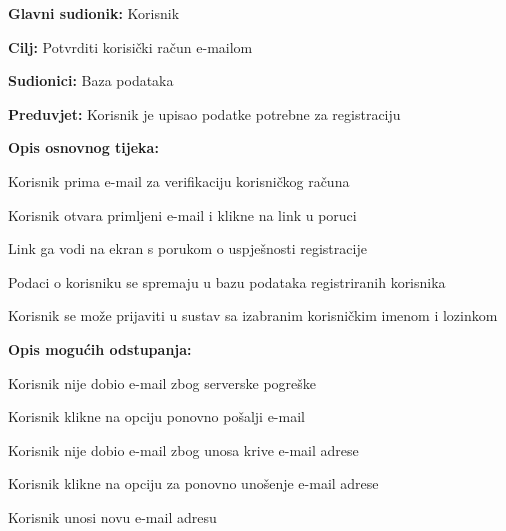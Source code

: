 					\noindent {}
					\begin{packed_item}
						
						\item \textbf{Glavni sudionik: } Korisnik
						\item  \textbf{Cilj:} Potvrditi korisički račun e-mailom
						\item  \textbf{Sudionici:} Baza podataka
						\item  \textbf{Preduvjet:} Korisnik je upisao podatke potrebne za registraciju
						\item  \textbf{Opis osnovnog tijeka:}
						
						\item[] \begin{packed_enum}
							
							\item Korisnik prima e-mail za verifikaciju korisničkog računa
							\item Korisnik otvara primljeni e-mail i klikne na link u poruci
							\item Link ga vodi na ekran s porukom o uspješnosti registracije
							\item Podaci o korisniku se spremaju u bazu podataka registriranih korisnika
							\item Korisnik se može prijaviti u sustav sa izabranim korisničkim imenom i lozinkom
						\end{packed_enum}
						
						\item  \textbf{Opis mogućih odstupanja:}
						
						\item[] \begin{packed_item}
							
							\item[1.a] Korisnik nije dobio e-mail zbog serverske pogreške
							\item[] \begin{packed_enum}
								
								\item Korisnik klikne na opciju ponovno pošalji e-mail
								
							\end{packed_enum}
							\item[1.b] Korisnik nije dobio e-mail zbog unosa krive e-mail adrese
								\item[] \begin{packed_enum}
								
								\item Korisnik klikne na opciju za ponovno unošenje e-mail adrese
								\item Korisnik unosi novu e-mail adresu
								
							\end{packed_enum}
							
						\end{packed_item}
					\end{packed_item}
					
